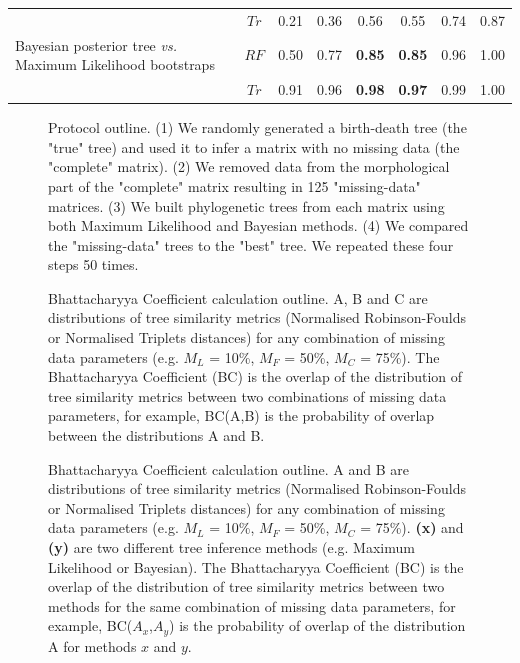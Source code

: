 \documentclass[12pt,letterpaper]{article}
\begin{document}
\begin{landscape}
\begin{table}[ht]
\begin{tabular}{lccccccc}
                                                                       & $Tr$ & 0.21 & 0.36 & 0.56 & 0.55 & 0.74 & 0.87 \\ 
    Bayesian posterior tree \textit{vs.} Maximum Likelihood bootstraps & $RF$ & 0.50 & 0.77 & \textbf{0.85} & \textbf{0.85} & 0.96 & 1.00 \\ 
                                                                       & $Tr$ & 0.91 & 0.96 & \textbf{0.98} & \textbf{0.97} & 0.99 & 1.00 \\ 
   \hline
\end{tabular}
\label{Tab_Results-Difference_methods}
\end{table}
\end{landscape}



\begin{figure}
\caption{Protocol outline.
(1) We randomly generated a birth-death tree (the "true" tree) and used it to infer a matrix with no missing data (the "complete" matrix).
(2) We removed data from the morphological part of the "complete" matrix resulting in 125 "missing-data" matrices.
(3) We built phylogenetic trees from each matrix using both Maximum Likelihood and Bayesian methods.
(4) We compared the "missing-data" trees to the "best" tree.
We repeated these four steps 50 times.}
\label{Fig_Outline}
\end{figure}

\begin{figure}
\caption{Bhattacharyya Coefficient calculation outline. A, B and C are distributions of tree similarity metrics (Normalised Robinson-Foulds or Normalised Triplets distances) for any combination of missing data parameters (e.g. $M_{L}$ = 10\%, $M_{F}$ = 50\%, $M_{C}$ = 75\%). The Bhattacharyya Coefficient (BC) is the overlap of the distribution of tree similarity metrics between two combinations of missing data parameters, for example, BC(A,B) is the probability of overlap between the distributions A and B.}
\label{Fig_Bhattacharyya_Coefficients1} %
\end{figure}

\begin{figure}
\caption{Bhattacharyya Coefficient calculation outline. A and B are distributions of tree similarity metrics (Normalised Robinson-Foulds or Normalised Triplets distances) for any combination of missing data parameters (e.g. $M_{L}$ = 10\%, $M_{F}$ = 50\%, $M_{C}$ = 75\%). \textbf{(x)} and \textbf{(y)} are two different tree inference methods (e.g. Maximum Likelihood or Bayesian). The Bhattacharyya Coefficient (BC) is the overlap of the distribution of tree similarity metrics between two methods for the same combination of missing data parameters, for example, BC($A_{x}$,$A_{y}$) is the probability of overlap of the distribution A for methods $x$ and $y$.}
\label{Fig_Bhattacharyya_Coefficients2} %
\end{figure}
\end{document}
